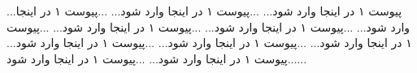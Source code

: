 \thispagestyle{empty}
\addappheadtotoc
\begin{center}
    \textbf{\appendixtocname}
\end{center}

\begin{appendices}
    ...پیوست ۱ در اینجا وارد شود...
    ...پیوست ۱ در اینجا وارد شود...
    ...پیوست ۱ در اینجا وارد شود...
    ...پیوست ۱ در اینجا وارد شود...
    ...پیوست ۱ در اینجا وارد شود...
    ...پیوست ۱ در اینجا وارد شود...
    ...پیوست ۱ در اینجا وارد شود...
    ...پیوست ۱ در اینجا وارد شود...
    ...پیوست ۱ در اینجا وارد شود...
    ...پیوست ۱ در اینجا وارد شود...
\end{appendices}
